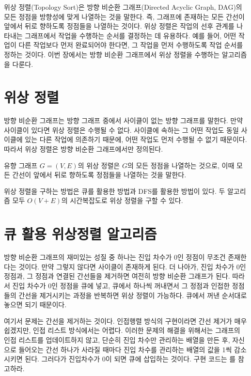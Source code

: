 위상 정렬(Topology Sort)은 방향 비순환 그래프(Directed Acyclic Graph, DAG)의 모든 정점을 방향성에 맞게 나열하는 것을 말한다. 즉, 그래프에 존재하는 모든 간선이 앞에서 뒤로 향하도록 정점들을 나열하는 것이다. 위상 정렬은 작업의 선후 관계를 나타내는 그래프에서 작업을 수행하는 순서를 결정하는 데 유용하다. 예를 들어, 어떤 작업이 다른 작업보다 먼저 완료되어야 한다면, 그 작업을 먼저 수행하도록 작업 순서를 정하는 것이다. 이번 장에서는 방향 비순환 그래프에서 위상 정렬을 수행하는 알고리즘을 다룬다.

\section{위상 정렬}
방향 비순환 그래프는 방향 그래프 중에서 사이클이 없는 방향 그래프를 말한다. 만약 사이클이 있다면 위상 정렬은 수행될 수 없다. 사이클에 속하는 그 어떤 작업도 동일 사이클에 있는 다른 작업에 의존하기 때문에, 어떤 작업도 먼저 수행될 수 없기 때문이다. 따라서 위상 정렬은 방향 비순환 그래프에서만 정의된다.

\begin{definition}[위상 정렬]
    유향 그래프 $G=(V, E)$의 위상 정렬은 $G$의 모든 정점을 나열하는 것으로, 이때 모든 간선이 앞에서 뒤로 향하도록 정점들을 나열하는 것을 말한다.
\end{definition}

위상 정렬을 구하는 방법은 큐를 활용한 방법과 DFS를 활용한 방법이 있다. 두 알고리즘 모두 $O(V+E)$의 시간복잡도로 위상 정렬을 구할 수 있다.

\section{큐 활용 위상정렬 알고리즘}
방향 비순환 그래프의 재미있는 성질 중 하나는 진입 차수가 0인 정점이 무조건 존재한다는 것이다. 만약 그렇지 않다면 사이클이 존재하게 된다. 더 나아가, 진입 차수가 0인 정점과, 그 정점과 연결된 간선들을 제거하면 여전히 방향 비순환 그래프가 된다. 따라서 진입 차수가 0인 정점을 큐에 넣고, 큐에서 하나씩 꺼내면서  그 정점과 인접한 정점들의 간선을 제거시키는 과정을 반복하면 위상 정렬이 가능하다. 큐에서 꺼낸 순서대로 놓으면 되기 때문이다.

여기서 문제는 간선을 제거하는 것이다. 인접행렬 방식의 구현이라면 간선 제거가 매우 쉽겠지만, 인접 리스트 방식에서는 어렵다. 이러한 문제의 해결을 위해서는 그래프의 인접 리스트를 업데이트하지 않고, 단순히 진입 차수만 관리하는 배열을 만든 후, 자신으로 들어오는 간선 하나가 사라질 때마다 진입 차수를 관리하는 배열의 값을 1씩 감소시키면 된다. 그러다가 진입차수가 0이 되면 큐에 삽입하는 것이다. 구현 코드는 를 참고하라.

